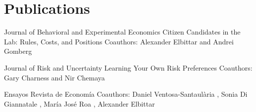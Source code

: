 
\section{Publications}

{Journal of Behavioral and Experimental Economics}
{Citizen Candidates in the Lab: Rules, Costs, and Positions}
{}{}
{Coauthors: Alexander Elbittar and Andrei Gomberg}

{Journal of Risk and Uncertainty}
{Learning Your Own Risk Preferences}
{}{}
{Coauthors: Gary Charness and Nir Chemaya}


{Ensayos Revista de Economía}
{
}
{}{}
{Coauthors: Daniel Ventosa-Santaulària
	, Sonia Di Giannatale
	, María José Roa
	, Alexander Elbittar
}


